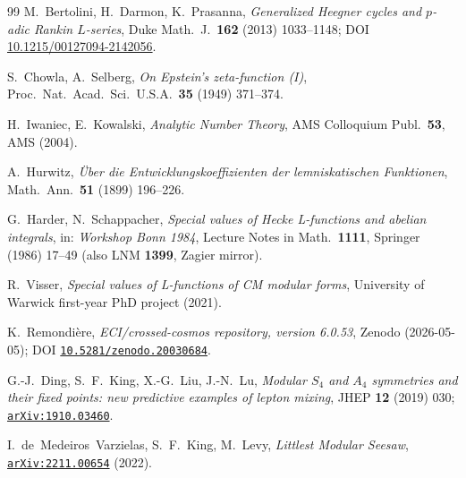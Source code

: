 \documentclass[a4paper,11pt]{article}
\newcommand{\arXiv}[1]{\href{https://arxiv.org/abs/#1}{\texttt{arXiv:#1}}}
\newcommand{\Zeno}{\href{https://doi.org/10.5281/zenodo.20030684}{\texttt{10.5281/zenodo.20030684}}}
\theoremstyle{definition}
\theoremstyle{remark}
\begin{document}
\begin{thebibliography}{99}
M.~Bertolini, H.~Darmon, K.~Prasanna,
\emph{Generalized Heegner cycles and $p$-adic Rankin $L$-series},
Duke Math.\ J.\ \textbf{162} (2013) 1033--1148;
DOI \href{https://doi.org/10.1215/00127094-2142056}{10.1215/00127094-2142056}.

S.~Chowla, A.~Selberg,
\emph{On Epstein's zeta-function (I)},
Proc.~Nat.~Acad.~Sci.~U.S.A.\ \textbf{35} (1949) 371--374.

H.~Iwaniec, E.~Kowalski,
\emph{Analytic Number Theory},
AMS Colloquium Publ.\ \textbf{53}, AMS (2004).

A.~Hurwitz,
\emph{\"Uber die Entwicklungskoeffizienten der lemniskatischen
Funktionen},
Math.~Ann.\ \textbf{51} (1899) 196--226.

G.~Harder, N.~Schappacher,
\emph{Special values of Hecke L-functions and abelian integrals},
in: \emph{Workshop Bonn 1984}, Lecture Notes in Math.\ \textbf{1111},
Springer (1986) 17--49 (also LNM \textbf{1399}, Zagier mirror).

R.~Visser,
\emph{Special values of L-functions of CM modular forms},
University of Warwick first-year PhD project (2021).

K.~Remondi\`ere,
\emph{ECI/crossed-cosmos repository, version 6.0.53},
Zenodo (2026-05-05);
DOI \Zeno.


G.-J.~Ding, S.~F.~King, X.-G.~Liu, J.-N.~Lu,
\emph{Modular $S_4$ and $A_4$ symmetries and their fixed points:
new predictive examples of lepton mixing},
JHEP \textbf{12} (2019) 030;
\arXiv{1910.03460}.

I.~de~Medeiros~Varzielas, S.~F.~King, M.~Levy,
\emph{Littlest Modular Seesaw},
\arXiv{2211.00654} (2022).


\end{thebibliography}
\end{document}
